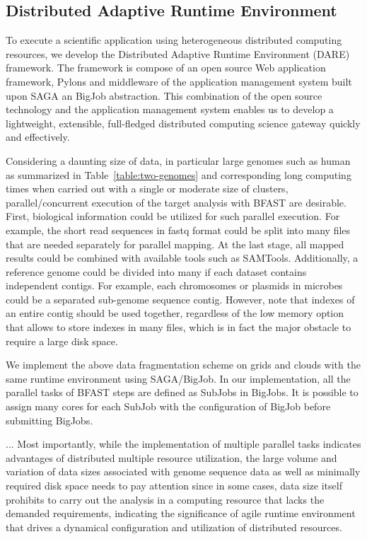 \documentclass{acm_proc_article-sp}
\begin{document}
\subsection{Distributed Adaptive Runtime Environment}

To execute a scientific application using heterogeneous distributed
computing resources, we develop the Distributed Adaptive Runtime
Environment (DARE) framework\cite{dareurl}.  The framework is compose
of an open source Web application framework, Pylons and middleware of
the application management system built upon SAGA an BigJob
abstraction\cite{saga-ccgrid10,saga-royalsoc,saga-web,jha2009developing,ecmls10}.
This combination of the open source technology and the application
management system enables us to develop a lightweight, extensible,
full-fledged distributed computing science gateway quickly and
effectively\cite{pylonsurl}.

Considering a daunting size of data, in particular large genomes such as human as summarized in Table~\ref{table:two-genomes} and corresponding long computing times when carried out with a single or moderate size of clusters, parallel/concurrent execution of the target analysis with BFAST are desirable.  First, biological information could be utilized for such parallel execution. For example, the short read sequences in fastq format could be split into many files that are needed separately for parallel mapping.  At the last stage, all mapped results could be combined with available tools such as SAMTools\cite{samtools}.   Additionally, a reference genome could be divided into many if each dataset contains independent contigs.  For example, each chromosomes or plasmids in microbes could be a separated sub-genome sequence contig.  However, note that indexes of an entire contig should be used together, regardless of the low memory option that allows to store indexes in many files, which is in fact the major obstacle to require a large disk space.

We implement the above data fragmentation scheme on grids and clouds with the same runtime environment using SAGA/BigJob\cite{saga-royalsoc,saga-ccgrid10, ecmls10}.  In our implementation, all the parallel tasks of BFAST steps are defined as SubJobs in BigJobs.  It is possible to assign many cores for each SubJob with the configuration of BigJob before submitting BigJobs. 
  
... Most importantly, while the implementation
of multiple parallel tasks indicates advantages of distributed
multiple resource utilization, the large volume and variation of data
sizes associated with genome sequence data as well as minimally
required disk space needs to pay attention since in some cases, data
size itself prohibits to carry out the analysis in a computing
resource that lacks the demanded requirements, indicating the
significance of agile runtime environment that drives a dynamical
configuration and utilization of distributed resources.
\end{document}
